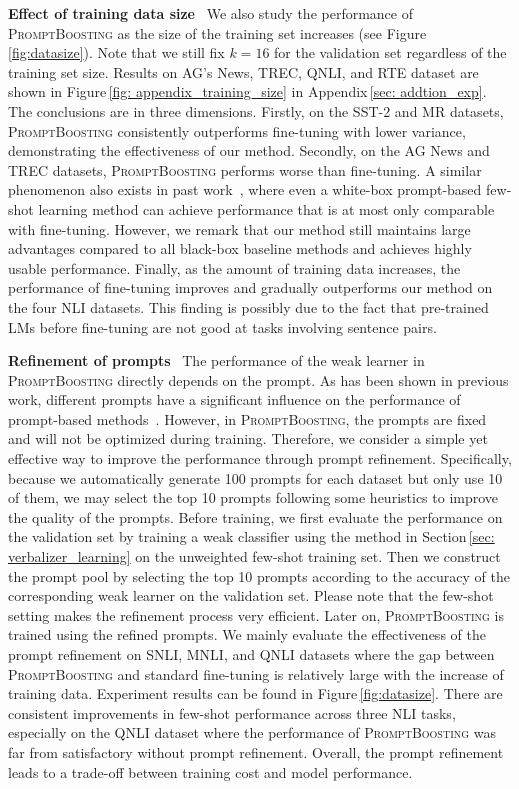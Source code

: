 \documentclass{article}
\theoremstyle{plain}
\theoremstyle{definition}
\theoremstyle{remark}
\newcommand{\alg}{\textsc{PromptBoosting}}
\begin{document}
\noindent \textbf{Effect of training data size} \ 
We also study the performance of {\alg} as the size of the training set increases (see Figure\,\ref{fig:datasize}). Note that we still fix $k = 16$ for the validation set regardless of the training set size. Results on AG's News, TREC, QNLI, and RTE dataset are shown in Figure\,\ref{fig: appendix_training_size} in Appendix\,\ref{sec: addtion_exp}. The conclusions are in three dimensions. Firstly, on the SST-2 and MR datasets, {\alg} consistently outperforms fine-tuning with lower variance, demonstrating the effectiveness of our method. Secondly, on the AG News and TREC datasets, {\alg} performs worse than fine-tuning. A similar phenomenon also exists in past work~\citep{gao2021making}, where even a white-box prompt-based few-shot learning method can achieve performance that is at most only comparable with fine-tuning. However, we remark that our method still maintains large advantages compared to all black-box baseline methods and achieves highly usable performance. Finally, as the amount of training data increases, the performance of fine-tuning improves and gradually outperforms our method on the four NLI datasets. This finding is possibly due to the fact that pre-trained LMs before fine-tuning are not good at tasks involving sentence pairs.

\noindent \textbf{Refinement of prompts} \ 
The performance of the weak learner in {\alg} directly depends on the prompt. As has been shown in previous work, different prompts have a significant influence on the performance of prompt-based methods~\citep{shin2020autoprompt, gao2021making}. However, in {\alg}, the prompts are fixed and will not be optimized during training.
Therefore, we consider a simple yet effective way to improve the performance through prompt refinement. Specifically, because we automatically generate 100 prompts for each dataset but only use 10 of them, we may select the top 10 prompts following some heuristics to improve the quality of the prompts. Before training, we first evaluate the performance on the validation set by training a weak classifier using the method in Section\,\ref{sec: verbalizer_learning} on the unweighted few-shot training set. Then we construct the prompt pool by selecting the top 10 prompts according to the accuracy of the corresponding weak learner on the validation set. Please note that the few-shot setting makes the refinement process very efficient. Later on, {\alg} is trained using the refined prompts. We mainly evaluate the effectiveness of the prompt refinement on SNLI, MNLI, and QNLI datasets where the gap between {\alg} and standard fine-tuning is relatively large with the increase of training data. Experiment results can be found in Figure\,\ref{fig:datasize}. There are consistent improvements in few-shot performance across three NLI tasks, especially on the QNLI dataset where the performance of {\alg} was far from satisfactory without prompt refinement. Overall, the prompt refinement leads to a trade-off between training cost and model performance.
\end{document}
